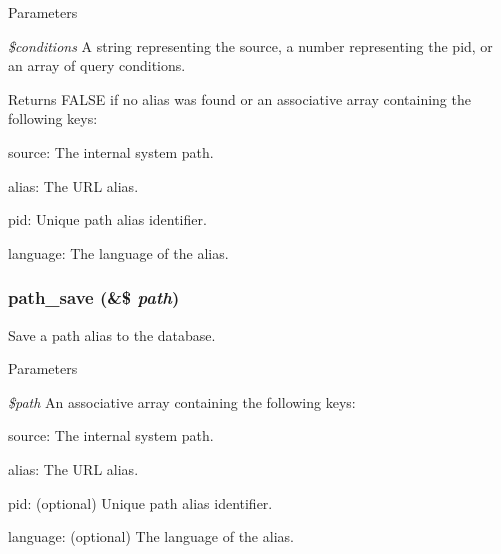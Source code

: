 \begin{DoxyParams}{Parameters}
\item[{\em \$conditions}]A string representing the source, a number representing the pid, or an array of query conditions.\end{DoxyParams}
\begin{DoxyReturn}{Returns}
FALSE if no alias was found or an associative array containing the following keys:
\begin{DoxyItemize}
\item source: The internal system path.
\item alias: The URL alias.
\item pid: Unique path alias identifier.
\item language: The language of the alias. 
\end{DoxyItemize}
\end{DoxyReturn}
\hypertarget{path_8inc_a2560e9e01e6d4f6b38c4e55c39715e25}{
\subsubsection[{path\_\-save}]{\setlength{\rightskip}{0pt plus 5cm}path\_\-save (\&\$ {\em path})}}
\label{path_8inc_a2560e9e01e6d4f6b38c4e55c39715e25}
Save a path alias to the database.


\begin{DoxyParams}{Parameters}
\item[{\em \$path}]An associative array containing the following keys:
\begin{DoxyItemize}
\item source: The internal system path.
\item alias: The URL alias.
\item pid: (optional) Unique path alias identifier.
\item language: (optional) The language of the alias. 
\end{DoxyItemize}\end{DoxyParams}
